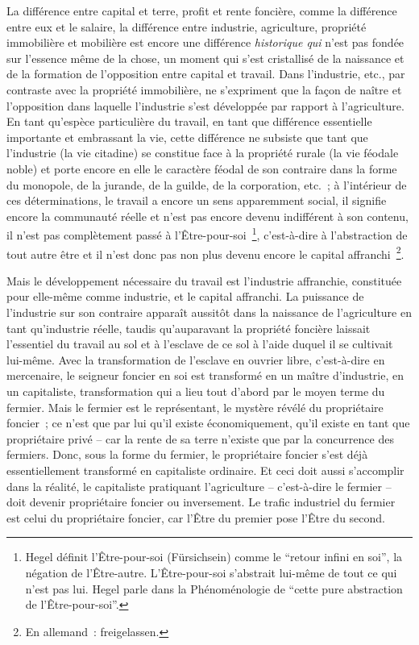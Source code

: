 \documentclass[french,twoside]{book} %
\begin{document}
La différence entre capital et terre, profit et rente foncière, comme la différence entre eux et le salaire, la différence entre industrie, agriculture, propriété immobilière et mobilière est encore une différence \emph{historique qui} n’est pas fondée sur l’essence même de la chose, un moment qui s’est cristallisé de la naissance et de la formation de l’opposition entre capital et travail. Dans l’industrie, etc., par contraste avec la propriété immobilière, ne s’expriment que la façon de naître et l’opposition dans laquelle l’industrie s’est développée par rapport à l’agriculture. En tant qu’espèce particulière du travail, en tant que différence essentielle importante et embrassant la vie, cette différence ne subsiste que tant que l’industrie (la vie citadine) se constitue face à la propriété rurale (la vie féodale noble) et porte encore en elle le caractère féodal de son contraire dans la forme du monopole, de la jurande, de la guilde, de la corporation, etc. ; à l’intérieur de ces déterminations, le travail a encore un sens apparemment social, il signifie encore la communauté réelle et n’est pas encore devenu indifférent à son contenu, il n’est pas complètement passé à l’Être-pour-soi \footnote{Hegel définit l’Être-pour-soi (Fürsichsein) comme le “retour infini en soi”, la négation de l’Être-autre. L’Être-pour-soi s’abstrait lui-même de tout ce qui n’est pas lui. Hegel parle dans la Phénoménologie de “cette pure abstraction de l’Être-pour-soi”.}, c’est-à-dire à l’abstraction de tout autre être et il n’est donc pas non plus devenu encore le capital affranchi \footnote{En allemand : freigelassen.}.\par
[XLII] Mais le développement nécessaire du travail est l’industrie affranchie, constituée pour elle-même comme industrie, et le capital affranchi. La puissance de l’industrie sur son contraire apparaît aussitôt dans la naissance de l’agriculture en tant qu’industrie réelle, taudis qu’auparavant la propriété foncière laissait l’essentiel du travail au sol et à l’esclave de ce sol à l’aide duquel il se cultivait lui-même. Avec la transformation de l’esclave en ouvrier libre, c’est-à-dire en mercenaire, le seigneur foncier en soi est transformé en un maître d’industrie, en un capitaliste, transformation qui a lieu tout d’abord par le moyen terme du fermier. Mais le fermier est le représentant, le mystère révélé du propriétaire foncier ; ce n’est que par lui qu’il existe économiquement, qu’il existe en tant que propriétaire privé – car la rente de sa terre n’existe que par la concurrence des fermiers. Donc, sous la forme du fermier, le propriétaire foncier s’est déjà essentiellement transformé en capitaliste ordinaire. Et ceci doit aussi s’accomplir dans la réalité, le capitaliste pratiquant l’agriculture – c’est-à-dire le fermier – doit devenir propriétaire foncier ou inversement. Le trafic industriel du fermier est celui du propriétaire foncier, car l’Être du premier pose l’Être du second.\par
\end{document}

